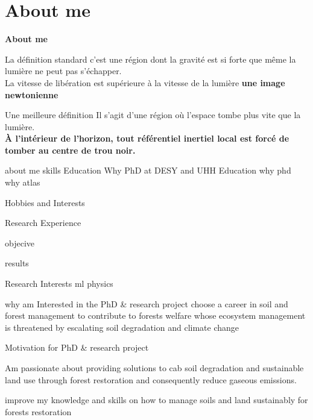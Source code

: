 
\section{About me}
 
\begin{frame}{\underline{\secname}}
	
\begin{center}
\textbf{About me}
\end{center}
\pause
\begin{block}{La définition standard}
	c'est une région dont la gravité est si forte que même la lumière ne peut pas s'échapper.\\
	La vitesse de libération est supérieure à la vitesse de la lumière
	\pause
	 \Rightarrow  \textbf{une image newtonienne}
\end{block}	
	
\pause	
	\begin{block}{Une meilleure définition}
Il s'agit d'une région où l'espace tombe plus vite que la lumière.\\
\textbf{\`{A} l'intérieur de l'horizon, tout référentiel inertiel local est forcé de tomber au centre de trou noir.}
	\end{block}	

\end{frame}

about me
skills
Education
Why PhD at DESY and UHH Education
    why phd 
    why atlas
    
Hobbies and Interests




Research Experience

objecive

results

Research Interests
    ml
    physics
    
    
    
why am Interested in the PhD & research project
choose a career in soil and forest management to contribute to forests welfare whose ecosystem management is threatened by escalating soil degradation and climate change

Motivation for PhD & research project

Am passionate about providing solutions to cab soil degradation and sustainable land use through forest restoration and consequently reduce gaseous emissions.

improve my knowledge and skills on how to manage soils and land sustainably for forests restoration
